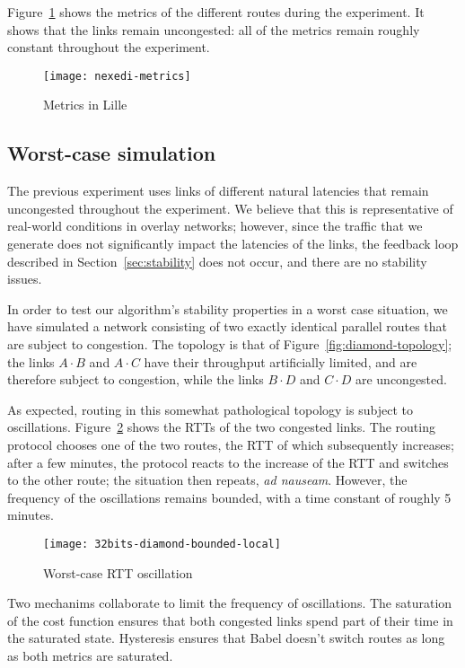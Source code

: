 \documentclass[conference,letterpaper]{IEEEtran}
\begin{document}
Figure~\ref{fig:nexedi-metrics} shows the metrics of the different
routes during the experiment.  It shows that the links remain
uncongested: all of the metrics remain roughly constant throughout the
experiment.

\begin{figure}[htb]
\centering
\texttt{[image: nexedi-metrics]}
\caption{Metrics in Lille}
\label{fig:nexedi-metrics}
\end{figure}

\subsection{Worst-case simulation} \label{sec:worst-case}

The previous experiment uses links of different natural latencies that
remain uncongested throughout the experiment.  We believe that this is
representative of real-world conditions in overlay networks; however,
since the traffic that we generate does not significantly impact the
latencies of the links, the feedback loop described in
Section~\ref{sec:stability} does not occur, and there are no stability
issues.

In order to test our algorithm's stability properties in a worst case
situation, we have simulated a network consisting of two exactly
identical parallel routes that are subject to congestion.  The
topology is that of Figure~\ref{fig:diamond-topology}; the links $A\cdot
B$ and $A\cdot C$ have their throughput artificially limited, and are
therefore subject to congestion, while the links $B\cdot D$ and
$C\cdot D$ are uncongested.

As expected, routing in this somewhat pathological topology is subject
to oscillations.  Figure~\ref{fig:diamond-stability-rtt} shows the RTTs
of the two congested links.  The routing protocol chooses one of the
two routes, the RTT of which subsequently increases; after a few
minutes, the protocol reacts to the increase of the RTT and switches
to the other route; the situation then repeats, \emph{ad nauseam}.
However, the frequency of the oscillations remains bounded, with
a time constant of roughly 5 minutes.

\begin{figure}[htb]
\centering
\texttt{[image: 32bits-diamond-bounded-local]}
\caption{Worst-case RTT oscillation}
\label{fig:diamond-stability-rtt}
\end{figure}

Two mechanims collaborate to limit the frequency of oscillations.  The
saturation of the cost function ensures that both congested links
spend part of their time in the saturated state.  Hysteresis ensures
that Babel doesn't switch routes as long as both metrics are saturated.
\end{document}
